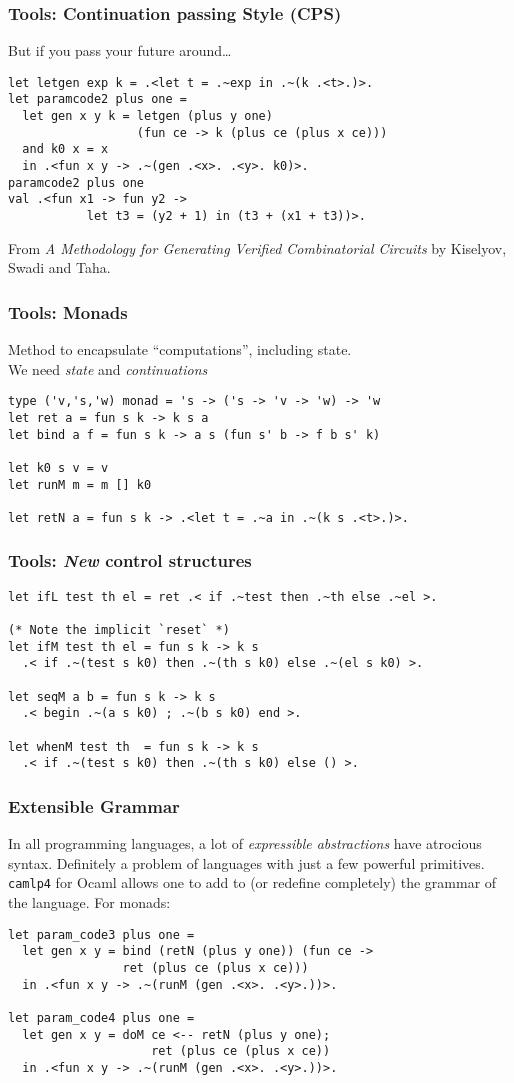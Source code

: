 \documentclass{beamer}
\begin{document}
\begin{frame}[fragile]
    \frametitle{Tools: Continuation passing Style (CPS)}
    But if you pass your future around\dots
\begin{verbatim}
let letgen exp k = .<let t = .~exp in .~(k .<t>.)>.
let paramcode2 plus one =
  let gen x y k = letgen (plus y one) 
                  (fun ce -> k (plus ce (plus x ce)))
  and k0 x = x
  in .<fun x y -> .~(gen .<x>. .<y>. k0)>.
paramcode2 plus one
val .<fun x1 -> fun y2 -> 
           let t3 = (y2 + 1) in (t3 + (x1 + t3))>.
\end{verbatim}
From \textit{A Methodology for Generating Verified Combinatorial Circuits} by 
Kiselyov, Swadi and Taha.
\end{frame}

\begin{frame}[fragile]
    \frametitle{Tools: Monads}
    Method to encapsulate ``computations'', including state.\\
    We need \emph{state} and \emph{continuations}
\begin{verbatim}
type ('v,'s,'w) monad = 's -> ('s -> 'v -> 'w) -> 'w
let ret a = fun s k -> k s a
let bind a f = fun s k -> a s (fun s' b -> f b s' k)

let k0 s v = v
let runM m = m [] k0

let retN a = fun s k -> .<let t = .~a in .~(k s .<t>.)>.
\end{verbatim}
\end{frame}

\begin{frame}[fragile]
    \frametitle{Tools: \textit{New} control structures}
\begin{verbatim}
let ifL test th el = ret .< if .~test then .~th else .~el >.

(* Note the implicit `reset` *)
let ifM test th el = fun s k -> k s
  .< if .~(test s k0) then .~(th s k0) else .~(el s k0) >.

let seqM a b = fun s k -> k s 
  .< begin .~(a s k0) ; .~(b s k0) end >.

let whenM test th  = fun s k -> k s 
  .< if .~(test s k0) then .~(th s k0) else () >.
\end{verbatim}
\end{frame}

\begin{frame}[fragile]
    \frametitle{Extensible Grammar}
    In all programming languages, a lot of \emph{expressible abstractions}
    have atrocious syntax.  Definitely a problem of languages with
    just a few powerful primitives. \texttt{camlp4} for Ocaml allows one to add
    to (or redefine completely) the grammar of the language.  For monads:
\begin{verbatim}
let param_code3 plus one =
  let gen x y = bind (retN (plus y one)) (fun ce -> 
                ret (plus ce (plus x ce)))
  in .<fun x y -> .~(runM (gen .<x>. .<y>.))>.

let param_code4 plus one =
  let gen x y = doM ce <-- retN (plus y one);
                    ret (plus ce (plus x ce))
  in .<fun x y -> .~(runM (gen .<x>. .<y>.))>.
\end{verbatim}
\end{frame}
\end{document}
